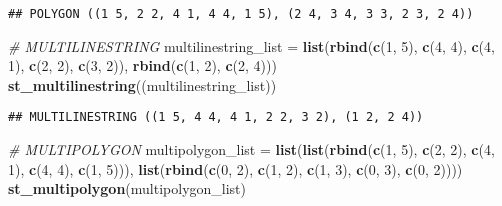 \documentclass[]{article}
\newenvironment{Shaded}{\begin{snugshade}}{\end{snugshade}}
\newcommand{\CommentTok}[1]{\textcolor[rgb]{0.56,0.35,0.01}{\textit{#1}}}
\newcommand{\DecValTok}[1]{\textcolor[rgb]{0.00,0.00,0.81}{#1}}
\newcommand{\KeywordTok}[1]{\textcolor[rgb]{0.13,0.29,0.53}{\textbf{#1}}}
\newcommand{\NormalTok}[1]{#1}
\newcommand{\StringTok}[1]{\textcolor[rgb]{0.31,0.60,0.02}{#1}}
\begin{document}
\begin{verbatim}
## POLYGON ((1 5, 2 2, 4 1, 4 4, 1 5), (2 4, 3 4, 3 3, 2 3, 2 4))
\end{verbatim}

\begin{Shaded}
\begin{Highlighting}[]
\CommentTok{# MULTILINESTRING}
\NormalTok{multilinestring_list =}\StringTok{ }\KeywordTok{list}\NormalTok{(}\KeywordTok{rbind}\NormalTok{(}\KeywordTok{c}\NormalTok{(}\DecValTok{1}\NormalTok{, }\DecValTok{5}\NormalTok{), }\KeywordTok{c}\NormalTok{(}\DecValTok{4}\NormalTok{, }\DecValTok{4}\NormalTok{), }\KeywordTok{c}\NormalTok{(}\DecValTok{4}\NormalTok{, }\DecValTok{1}\NormalTok{), }\KeywordTok{c}\NormalTok{(}\DecValTok{2}\NormalTok{, }\DecValTok{2}\NormalTok{), }\KeywordTok{c}\NormalTok{(}\DecValTok{3}\NormalTok{, }\DecValTok{2}\NormalTok{)),}
                            \KeywordTok{rbind}\NormalTok{(}\KeywordTok{c}\NormalTok{(}\DecValTok{1}\NormalTok{, }\DecValTok{2}\NormalTok{), }\KeywordTok{c}\NormalTok{(}\DecValTok{2}\NormalTok{, }\DecValTok{4}\NormalTok{)))}
\KeywordTok{st_multilinestring}\NormalTok{((multilinestring_list))}
\end{Highlighting}
\end{Shaded}

\begin{verbatim}
## MULTILINESTRING ((1 5, 4 4, 4 1, 2 2, 3 2), (1 2, 2 4))
\end{verbatim}

\begin{Shaded}
\begin{Highlighting}[]
\CommentTok{# MULTIPOLYGON}
\NormalTok{multipolygon_list =}\StringTok{ }\KeywordTok{list}\NormalTok{(}\KeywordTok{list}\NormalTok{(}\KeywordTok{rbind}\NormalTok{(}\KeywordTok{c}\NormalTok{(}\DecValTok{1}\NormalTok{, }\DecValTok{5}\NormalTok{), }\KeywordTok{c}\NormalTok{(}\DecValTok{2}\NormalTok{, }\DecValTok{2}\NormalTok{), }\KeywordTok{c}\NormalTok{(}\DecValTok{4}\NormalTok{, }\DecValTok{1}\NormalTok{), }\KeywordTok{c}\NormalTok{(}\DecValTok{4}\NormalTok{, }\DecValTok{4}\NormalTok{), }\KeywordTok{c}\NormalTok{(}\DecValTok{1}\NormalTok{, }\DecValTok{5}\NormalTok{))),}
                         \KeywordTok{list}\NormalTok{(}\KeywordTok{rbind}\NormalTok{(}\KeywordTok{c}\NormalTok{(}\DecValTok{0}\NormalTok{, }\DecValTok{2}\NormalTok{), }\KeywordTok{c}\NormalTok{(}\DecValTok{1}\NormalTok{, }\DecValTok{2}\NormalTok{), }\KeywordTok{c}\NormalTok{(}\DecValTok{1}\NormalTok{, }\DecValTok{3}\NormalTok{), }\KeywordTok{c}\NormalTok{(}\DecValTok{0}\NormalTok{, }\DecValTok{3}\NormalTok{), }\KeywordTok{c}\NormalTok{(}\DecValTok{0}\NormalTok{, }\DecValTok{2}\NormalTok{))))}
\KeywordTok{st_multipolygon}\NormalTok{(multipolygon_list)}
\end{Highlighting}
\end{Shaded}
\end{document}
